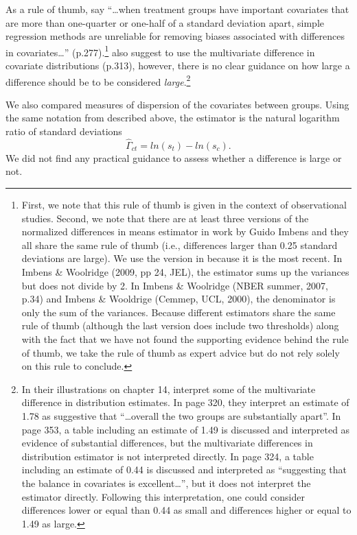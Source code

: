 As a rule of thumb, \citet{imbensCausalInferenceStatistics2015} say \enquote{\ldots when treatment groups have important covariates that are more than one-quarter or one-half of a standard deviation apart, simple regression methods are unreliable for removing biases associated with differences in covariates\ldots} (p.277).\footnote{First, we note that this rule of thumb is given in the context of observational studies. Second, we note that there are at least three versions of the normalized differences in means estimator in work by Guido Imbens and they all share the same rule of thumb (i.e., differences larger than 0.25 standard deviations are large). We use the version in \citet{imbensCausalInferenceStatistics2015} because it is the most recent. In Imbens \& Woolridge (2009, pp 24, JEL), the estimator sums up the variances but does not divide by 2. In Imbens \& Woolridge (NBER summer, 2007, p.34) and Imbens \& Wooldrige (Cemmep, UCL, 2000), the denominator is only the sum of the variances. Because different estimators share the same rule of thumb (although the last version does include two thresholds) along with the fact that we have not found the supporting evidence behind the rule of thumb, we take the rule of thumb as expert advice but do not rely solely on this rule to conclude.} \citet{imbensCausalInferenceStatistics2015} also suggest to use the multivariate difference in covariate distributions (p.313), however, there is no clear guidance on how large a difference should be to be considered \emph{large}.\footnote{In their illustrations on chapter 14, \citet{imbensCausalInferenceStatistics2015} interpret some of the multivariate difference in distribution estimates. In page 320, they interpret an estimate of 1.78 as suggestive that \enquote{…overall the two groups are substantially apart}. In page 353, a table including an estimate of 1.49 is discussed and interpreted as evidence of substantial differences, but the multivariate differences in distribution estimator is not interpreted directly. In page 324, a table including an estimate of 0.44 is discussed and interpreted as \enquote{suggesting that the balance in covariates is excellent\ldots}, but it does not interpret the estimator directly. Following this interpretation, one could consider differences lower or equal than 0.44 as small and differences higher or equal to 1.49 as large.}

We also compared measures of dispersion of the covariates between groups. Using the same notation from \citet{imbensCausalInferenceStatistics2015} described above, the estimator is the natural logarithm ratio of standard deviations
\begin{equation*}
  \hat{\Gamma}_{ct}=ln(s_t)-ln(s_c).
\end{equation*}
We did not find any practical guidance to assess whether a difference is large or not.

